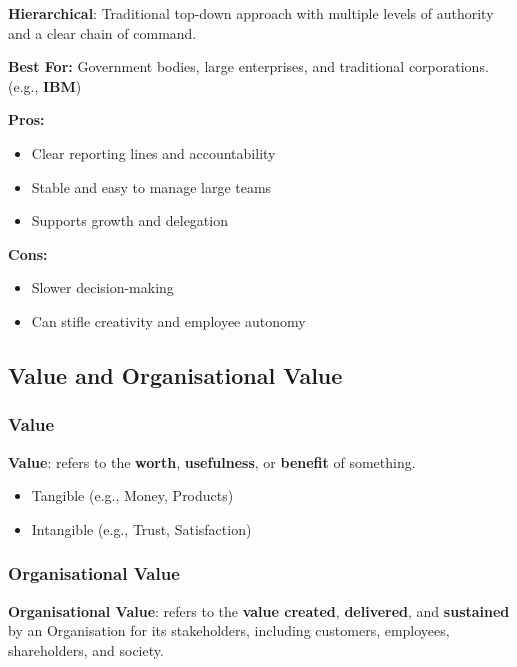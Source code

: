 \noindent\textbf{Hierarchical}: Traditional top-down approach with multiple levels of authority and a clear chain of command.

\noindent\textbf{Best For:} Government bodies, large enterprises, 
and traditional corporations. (e.g., \textbf{IBM})

\bigskip

\noindent\textbf{Pros:}

\begin{itemize}
    \item Clear reporting lines and accountability
    \item Stable and easy to manage large teams
    \item Supports growth and delegation
\end{itemize}

\bigskip

\noindent\textbf{Cons:}

\begin{itemize}
    \item Slower decision-making
    \item Can stifle creativity and employee autonomy
\end{itemize}

\subsection{Value and Organisational Value}

\subsubsection{Value}

\textbf{Value}: refers to the \textbf{worth}, \textbf{usefulness}, or \textbf{benefit} of something.

\begin{itemize}
    \item Tangible (e.g., Money, Products)
    \item Intangible (e.g., Trust, Satisfaction)
\end{itemize}

\subsubsection{Organisational Value}

\textbf{Organisational Value}: refers to the \textbf{value created}, \textbf{delivered}, and \textbf{sustained} by an Organisation for its stakeholders, including customers, employees, shareholders, and society.

